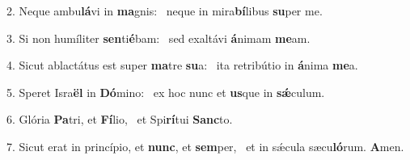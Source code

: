 2. Neque ambu\textbf{lá}vi in \textbf{ma}gnis: \ast\  neque in mira\textbf{bí}libus \textbf{su}per me.\

3. Si non humíliter \textbf{sen}ti\textbf{é}bam: \ast\  sed exaltávi \textbf{á}nimam \textbf{me}am.\

4. Sicut ablactátus est super \textbf{ma}tre \textbf{su}a: \ast\  ita retribútio in \textbf{á}nima \textbf{me}a.\

5. Speret Isra\textbf{ël} in \textbf{Dó}mino: \ast\  ex hoc nunc et \textbf{us}que in \textbf{sǽ}culum.\

6. Glória \textbf{Pa}tri, et \textbf{Fí}lio, \ast\  et Spi\textbf{rí}tui \textbf{Sanc}to.\

7. Sicut erat in princípio, et \textbf{nunc}, et \textbf{sem}per, \ast\  et in sǽcula sæcu\textbf{ló}rum. \textbf{A}men.\

